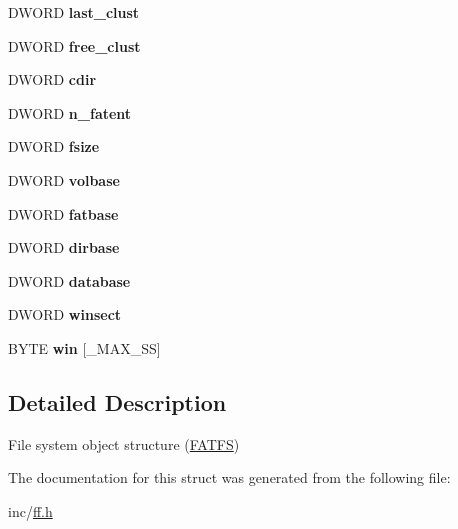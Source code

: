 \begin{DoxyCompactItemize}
\item 
D\+W\+O\+RD {\bfseries last\+\_\+clust}\hypertarget{structFATFS_ad315def289218e26ab78ff90fde700d1}{}\label{structFATFS_ad315def289218e26ab78ff90fde700d1}

\item 
D\+W\+O\+RD {\bfseries free\+\_\+clust}\hypertarget{structFATFS_a5fb49e6ac511bd97eaffdd636d0e4165}{}\label{structFATFS_a5fb49e6ac511bd97eaffdd636d0e4165}

\item 
D\+W\+O\+RD {\bfseries cdir}\hypertarget{structFATFS_a217d0ce0c8cec84aa7f0c142679412c6}{}\label{structFATFS_a217d0ce0c8cec84aa7f0c142679412c6}

\item 
D\+W\+O\+RD {\bfseries n\+\_\+fatent}\hypertarget{structFATFS_a8da50eeba6469bc20d60ca0cf9a1307c}{}\label{structFATFS_a8da50eeba6469bc20d60ca0cf9a1307c}

\item 
D\+W\+O\+RD {\bfseries fsize}\hypertarget{structFATFS_a53e9560659f14e66f306c2c444198bf3}{}\label{structFATFS_a53e9560659f14e66f306c2c444198bf3}

\item 
D\+W\+O\+RD {\bfseries volbase}\hypertarget{structFATFS_a8f0ca578755749d204f59dc83f1a7649}{}\label{structFATFS_a8f0ca578755749d204f59dc83f1a7649}

\item 
D\+W\+O\+RD {\bfseries fatbase}\hypertarget{structFATFS_a848fba02c4aabe02ef2984e578f33d64}{}\label{structFATFS_a848fba02c4aabe02ef2984e578f33d64}

\item 
D\+W\+O\+RD {\bfseries dirbase}\hypertarget{structFATFS_a3f72fd998dbcce4652a85a81fe944bc4}{}\label{structFATFS_a3f72fd998dbcce4652a85a81fe944bc4}

\item 
D\+W\+O\+RD {\bfseries database}\hypertarget{structFATFS_a5b6c0bc2e9fd2ae8ef714210a74a2d5d}{}\label{structFATFS_a5b6c0bc2e9fd2ae8ef714210a74a2d5d}

\item 
D\+W\+O\+RD {\bfseries winsect}\hypertarget{structFATFS_ac60e69c00e6bf7c25febfbac4dc1476b}{}\label{structFATFS_ac60e69c00e6bf7c25febfbac4dc1476b}

\item 
B\+Y\+TE {\bfseries win} \mbox{[}\+\_\+\+M\+A\+X\+\_\+\+SS\mbox{]}\hypertarget{structFATFS_a7cc35a593465e727ab87723c14610644}{}\label{structFATFS_a7cc35a593465e727ab87723c14610644}

\end{DoxyCompactItemize}


\subsection{Detailed Description}
File system object structure (\hyperlink{structFATFS}{F\+A\+T\+FS}) 

The documentation for this struct was generated from the following file\+:\begin{DoxyCompactItemize}
\item 
inc/\hyperlink{ff_8h}{ff.\+h}\end{DoxyCompactItemize}
